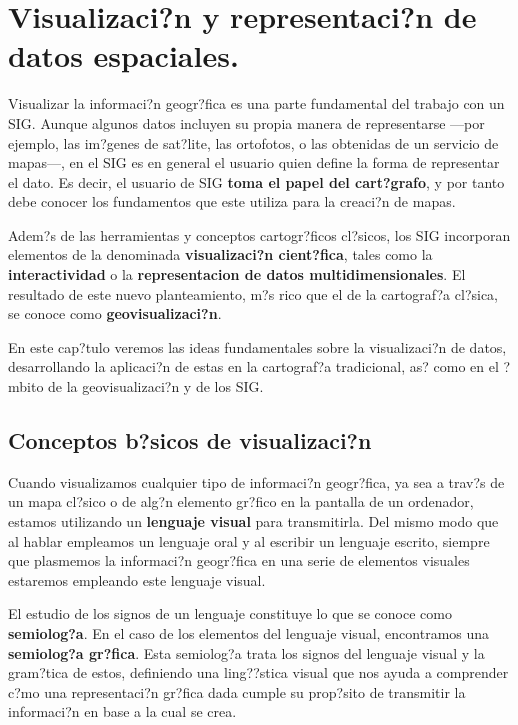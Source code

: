 \chapter{Visualizaci?n y representaci?n de datos espaciales. }


\pagestyle{fancy}

Visualizar la informaci?n geogr?fica es una parte fundamental del trabajo con un SIG. Aunque algunos datos incluyen su propia manera de representarse ---por  ejemplo, las im?genes de sat?lite, las ortofotos, o las obtenidas de un servicio de mapas---, en el SIG es en general el usuario quien define la forma de representar el dato. Es decir, el usuario de SIG \textbf{toma el papel del cart?grafo}, y por tanto debe conocer los fundamentos que este utiliza para la creaci?n de mapas.

Adem?s de las herramientas y conceptos cartogr?ficos cl?sicos, los SIG incorporan elementos de la denominada \textbf{visualizaci?n cient?fica}, tales como la \textbf{interactividad} o la \textbf{representacion de datos multidimensionales}. El resultado de este nuevo planteamiento, m?s rico que el de la cartograf?a cl?sica, se conoce como \textbf{geovisualizaci?n}. 

En este cap?tulo veremos las ideas fundamentales sobre la visualizaci?n de datos, desarrollando la aplicaci?n de estas en la cartograf?a tradicional, as? como en el ?mbito de la geovisualizaci?n y de los SIG.


\section{Conceptos b?sicos de visualizaci?n}

Cuando visualizamos cualquier tipo de informaci?n geogr?fica, ya sea a trav?s de un mapa cl?sico o de alg?n elemento gr?fico en la pantalla de un ordenador, estamos utilizando un \textbf{lenguaje visual} para transmitirla. Del mismo modo que al hablar empleamos un lenguaje oral y al escribir un lenguaje escrito, siempre que plasmemos la informaci?n geogr?fica en una serie de elementos visuales estaremos empleando este lenguaje visual.


El estudio de los signos de un lenguaje constituye lo que se conoce como \textbf{semiolog?a}. En el caso de los elementos del lenguaje visual, encontramos una \textbf{semiolog?a gr?fica}. Esta semiolog?a trata los signos del lenguaje visual y la gram?tica de estos, definiendo una ling??stica visual que nos ayuda a comprender c?mo una representaci?n gr?fica dada cumple su prop?sito de transmitir la informaci?n en base a la cual se crea.


